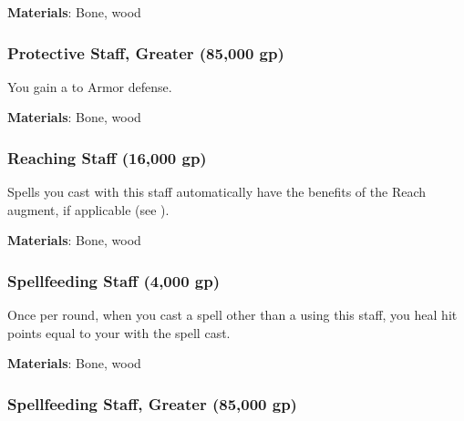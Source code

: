 \vspace{0.25em}
\textbf{Materials}: Bone, wood


\lowercase{\hypertarget{item:Protective Staff, Greater}{}}\label{item:Protective Staff, Greater}
\hypertarget{item:Protective Staff, Greater}{\subsubsection{Protective Staff, Greater\hfill{} (85,000 gp)}}

You gain a   to Armor defense.



\vspace{0.25em}
\textbf{Materials}: Bone, wood


\lowercase{\hypertarget{item:Reaching Staff}{}}\label{item:Reaching Staff}
\hypertarget{item:Reaching Staff}{\subsubsection{Reaching Staff\hfill{} (16,000 gp)}}

Spells you cast with this staff automatically have the benefits of the Reach augment, if applicable (see ).



\vspace{0.25em}
\textbf{Materials}: Bone, wood


\lowercase{\hypertarget{item:Spellfeeding Staff}{}}\label{item:Spellfeeding Staff}
\hypertarget{item:Spellfeeding Staff}{\subsubsection{Spellfeeding Staff\hfill{} (4,000 gp)}}

Once per round, when you cast a spell other than a  using this staff,
you heal hit points equal to your  with the spell cast.



\vspace{0.25em}
\textbf{Materials}: Bone, wood


\lowercase{\hypertarget{item:Spellfeeding Staff, Greater}{}}\label{item:Spellfeeding Staff, Greater}
\hypertarget{item:Spellfeeding Staff, Greater}{\subsubsection{Spellfeeding Staff, Greater\hfill{} (85,000 gp)}}

